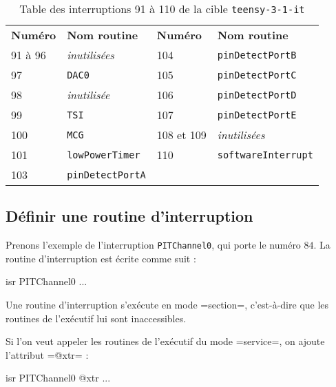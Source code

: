 \begin{table}[!t]
  \small
  \centering
  \begin{tabular}{ll|ll}
    \textbf{Numéro}& \textbf{Nom routine} & \textbf{Numéro}& \textbf{Nom routine} \\
    91 à 96  & \emph{inutilisées} &     104  & \texttt{pinDetectPortB}\\
    97  & \texttt{DAC0}  & 105  & \texttt{pinDetectPortC} \\
    98  & \emph{inutilisée} & 106  & \texttt{pinDetectPortD}\\
    99  & \texttt{TSI} & 107  & \texttt{pinDetectPortE}\\
    100  & \texttt{MCG} & 108 et 109  & \emph{inutilisées}\\
    101  & \texttt{lowPowerTimer} & 110  & \texttt{softwareInterrupt}\\
    103  & \texttt{pinDetectPortA} & &\\
  \end{tabular}
  \caption{Table des interruptions 91 à 110 de la cible \texttt{teensy-3-1-it}}
  \ligne
\end{table}


\subsection{Définir une routine d'interruption}

Prenons l'exemple de l'interruption \texttt{PITChannel0}, qui porte le numéro $84$. La routine d'interruption est écrite comme suit :

\begin{PLM}[1]
isr PITChannel0 {
  ...
}
\end{PLM}

Une routine d'interruption s'exécute en mode \plm=section=, c'est-à-dire que les routines de l'exécutif lui sont inaccessibles. 

Si l'on veut appeler les routines de l'exécutif du mode \plm=service=, on ajoute l'attribut \plm=@xtr= :

\begin{PLM}[1]
isr PITChannel0 @xtr {
  ...
}
\end{PLM}









